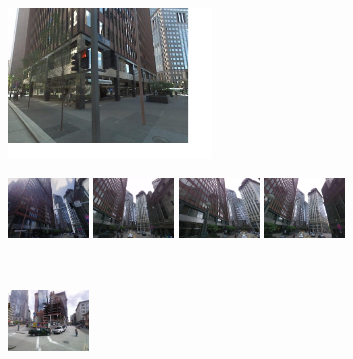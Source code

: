 \documentclass[table]{article} %
\begin{document}
    \begin{figure}[t!]
        \begin{minipage}{0.34\linewidth}
            \centering
            \vspace{5mm}
            \includegraphics[height=40mm]{imgs/ex1/query}
        \end{minipage}
        \begin{minipage}{0.75\linewidth}
            \begin{minipage}{\linewidth} 
                \colorbox{myGreen}{\includegraphics[height=16mm]{imgs/ex1/FVsvm1}}
                \colorbox{myGreen}{\includegraphics[height=16mm]{imgs/ex1/FVsvm2}}
                \colorbox{myGreen}{\includegraphics[height=16mm]{imgs/ex1/FVsvm3}}
                \colorbox{myGreen}{\includegraphics[height=16mm]{imgs/ex1/FVsvm4}}
            \end{minipage}
            \\
            \begin{minipage}{\linewidth}
                \colorbox{myRed}{\includegraphics[height=16mm]{imgs/ex1/FV1}}

\end{minipage}
\end{minipage}
\end{figure}
\end{document}
